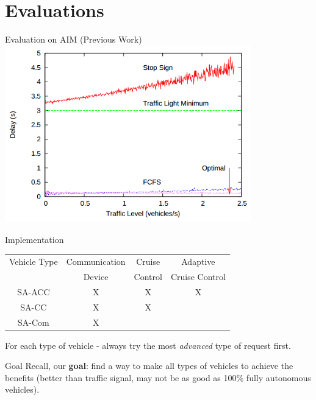\documentclass{beamer}
\newcommand{\goal}{find a way to make all types of vehicles to
achieve the benefits (better than traffic signal, may not be as good
as 100\% fully autonomous vehicles)}
\begin{document}
\section{Evaluations}

\begin{frame}{Evaluation on AIM (Previous Work)}
\includegraphics[width=0.8\textwidth]{old_result.png}

\cite{bib:Dresner08Multiagent}
\end{frame}

\begin{frame}{Implementation}
\begin{tabular}{|c|c|c|c|}
  \hline
  Vehicle Type & Communication & Cruise & Adaptive \\
               & Device & Control & Cruise Control \\
  \hline
  SA-ACC & X & X & X  \\
  \hline
  SA-CC & X & X &  \\
  \hline
  SA-Com & X & &  \\
  \hline
\end{tabular}

\hfill

For each type of vehicle - always try the most \emph{advanced} type of
request first.
\end{frame}

\begin{frame}{Goal}
Recall, our \textbf{goal}: \pause \goal.
\end{frame}
\end{document}
